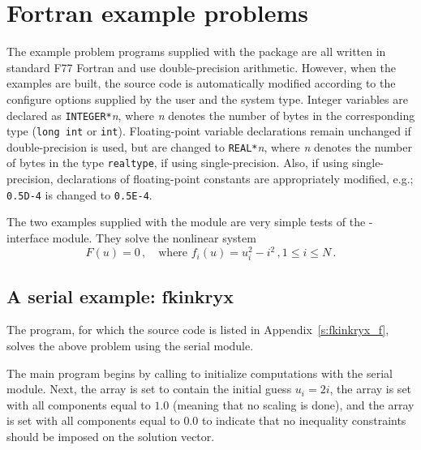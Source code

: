 \section{Fortran example problems}\label{s:ex_fortran}

The {\F} example problem programs supplied with the {\kinsol}
package are all written in standard F77 Fortran and use double-precision
arithmetic. However, when the {\F} examples are built, the source code is
automatically modified according to the configure options supplied by the
user and the system type. Integer variables are declared as {\tt INTEGER*}{\em n},
where {\em n} denotes the number of bytes in the corresponding {\C} type
({\tt long int} or {\tt int}). Floating-point variable declarations remain
unchanged if double-precision is used, but are changed to {\tt REAL*}{\em n},
where {\em n} denotes the number of bytes in the {\sundials} type {\tt realtype},
if using single-precision. Also, if using single-precision, declarations of
floating-point constants are appropriately modified, e.g.; {\tt 0.5D-4} is
changed to {\tt 0.5E-4}.


The two examples supplied with the {\fkinsol} module are very simple tests 
of the {\F}-{\C} interface module. 
They solve the nonlinear system
\begin{equation*}
  F(u) = 0 \, , \quad \text{where } f_i(u) = u_i^2 - i^2 \, , 1 \le i \le N \, . 
\end{equation*}

\subsection{A serial example: fkinkryx}\label{ss:fkinkryx}

The  program, for which the source code is listed in
Appendix~\ref{s:fkinkryx_f}, solves the above problem using the serial
{\nvecs} module.

The main program begins by calling  to initialize computations
with the serial {\nvecs} module. Next, the array  is set to contain
the initial guess $u_i = 2 i$, the array  is set with all 
components equal to $1.0$ (meaning that no scaling is done), and the array
 is set with all components equal to $0.0$ to indicate that no 
inequality constraints should be imposed on the solution vector.

